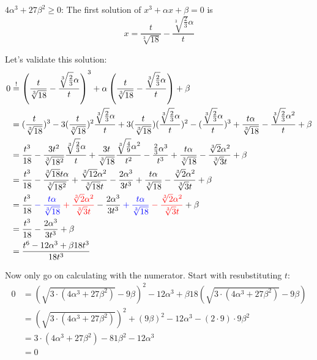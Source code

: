 $4 \alpha^3 + 27 \beta^2 \geq 0$:
The first solution of $x^3 + \alpha x + \beta = 0$ is
\[x = \frac{t}{\sqrt[3]{18}} - \frac{\sqrt[3]{\frac{2}{3}} \alpha }{t}\]

Let's validate this solution:
\allowdisplaybreaks
\begin{align}
    0 &\stackrel{!}{=} \left (\frac{t}{\sqrt[3]{18}} - \frac{\sqrt[3]{\frac{2}{3}} \alpha }{t} \right )^3 + \alpha \left (\frac{t}{\sqrt[3]{18}} - \frac{\sqrt[3]{\frac{2}{3}} \alpha }{t} \right ) + \beta\\
&= (\frac{t}{\sqrt[3]{18}})^3
    - 3 (\frac{t}{\sqrt[3]{18}})^2 \frac{\sqrt[3]{\frac{2}{3}} \alpha }{t}
    + 3 (\frac{t}{\sqrt[3]{18}})(\frac{\sqrt[3]{\frac{2}{3}} \alpha }{t})^2
    - (\frac{\sqrt[3]{\frac{2}{3}} \alpha }{t})^3
    + \frac{t \alpha}{\sqrt[3]{18}} - \frac{\sqrt[3]{\frac{2}{3}} \alpha^2 }{t} + \beta\\
&= \frac{t^3}{18}
    - \frac{3t^2}{\sqrt[3]{18^2}} \frac{\sqrt[3]{\frac{2}{3}} \alpha }{t}
    + \frac{3t}{\sqrt[3]{18}} \frac{\sqrt[3]{\frac{4}{9}} \alpha^2 }{t^2}
    - \frac{\frac{2}{3} \alpha^3 }{t^3}
    + \frac{t \alpha }{\sqrt[3]{18}} - \frac{\sqrt[3]{2} \alpha^2 }{\sqrt[3]{3} t} + \beta\\
&= \frac{t^3}{18}
    - \frac{\sqrt[3]{18} t \alpha}{\sqrt[3]{18^2}}
    + \frac{\sqrt[3]{12} \alpha^2}{\sqrt[3]{18} t}
    - \frac{2 \alpha^3 }{3t^3}
    + \frac{t \alpha }{\sqrt[3]{18}} - \frac{\sqrt[3]{2} \alpha^2 }{\sqrt[3]{3} t} + \beta\\
&= \frac{t^3}{18}
    \color{blue} - \frac{t \alpha}{\sqrt[3]{18}}
    \color{red}  + \frac{\sqrt[3]{2} \alpha^2}{\sqrt[3]{3} t}
    \color{black}- \frac{2 \alpha^3 }{3 t^3}
    \color{blue} + \frac{t \alpha }{\sqrt[3]{18}}
    \color{red}  - \frac{\sqrt[3]{2} \alpha^2 }{\sqrt[3]{3} t}
    \color{black}+ \beta\\
&= \frac{t^3}{18} - \frac{2 \alpha^3 }{3 t^3} + \beta\\
&= \frac{t^6 - 12 \alpha^3 + \beta 18 t^3}{18t^3}
\end{align}

Now only go on calculating with the numerator. Start with resubstituting
$t$:
\begin{align}
0 &= (\sqrt{3 \cdot (4 \alpha^3 + 27 \beta^2)} -9\beta)^2 - 12 \alpha^3 + \beta 18 (\sqrt{3 \cdot (4 \alpha^3 + 27 \beta^2)} -9\beta)\\
&= (\sqrt{3 \cdot (4 \alpha^3 + 27 \beta^2)})^2 +(9\beta)^2 - 12 \alpha^3 -(2 \cdot 9)\cdot 9\beta^2\\
&= 3 \cdot (4 \alpha^3 + 27 \beta^2) -81 \beta^2 - 12 \alpha^3\\
&= 0
\end{align}
